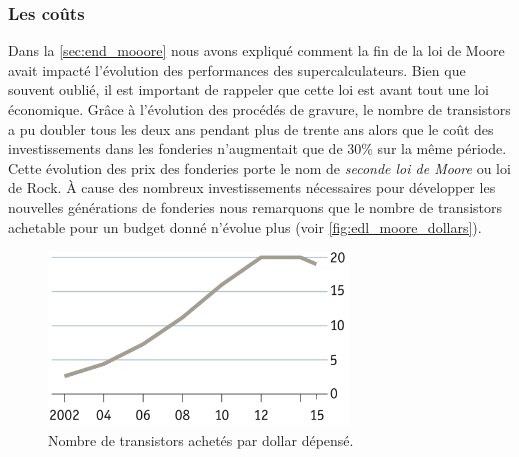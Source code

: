     \subsubsection{Les coûts}\label{sec:edl_chal_prix}

    
        Dans la \autoref{sec:end_mooore} nous avons expliqué comment la fin de la loi de Moore avait impacté l'évolution des performances des supercalculateurs. Bien que souvent oublié, il est important de rappeler que cette loi est avant tout une loi économique.
        Grâce à l'évolution des procédés de gravure, le nombre de transistors a pu doubler tous les deux ans pendant plus de trente ans alors que le coût des investissements dans les fonderies n'augmentait que de 30\% sur la même période. Cette évolution des prix des fonderies porte le nom de \textit{seconde loi de Moore} ou loi de Rock. À cause des nombreux investissements nécessaires pour développer les nouvelles générations de fonderies nous remarquons que le nombre de transistors achetable pour un budget donné n'évolue plus (voir \autoref{fig:edl_moore_dollars}).
    
        \begin{figure}
        \center
        \includegraphics[width=8cm]{images/edl_moore_dollars.png}
        \caption{\label{fig:edl_moore_dollars} Nombre de transistors achetés par dollar dépensé\protect\footnotemark.}
        \end{figure}

    

